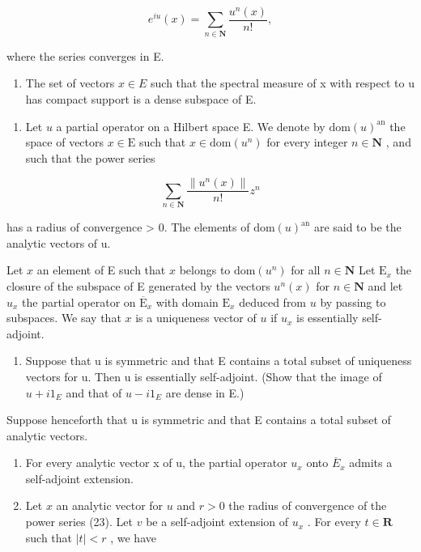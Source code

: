 \[
e ^ {i u} (x) = \sum_ {n \in \mathbf {N}} \frac {u ^ {n} (x)}{n !},
\]

where the series converges in E.

\begin{enumerate}
\def\labelenumi{\alph{enumi})}
\setcounter{enumi}{1}
\tightlist
\item
  The set of vectors \(x \in E\) such that the spectral measure of x with respect to u has compact support is a dense subspace of E.
\end{enumerate}

\begin{enumerate}
\def\labelenumi{\arabic{enumi})}
\setcounter{enumi}{19}
\tightlist
\item
  Let \(u\) a partial operator on a Hilbert space E. We denote by \(\mathrm{dom}(u)^{\mathrm{an}}\) the space of vectors \(x \in \mathrm{E}\) such that \(x \in \mathrm{dom}(u^n)\) for every integer \(n \in \mathbf{N}\) , and such that the power series
\end{enumerate}

\[
\sum_ {n \in \mathbf {N}} \frac {\| u ^ {n} (x) \|}{n !} z ^ {n}\tag{23}
\]

has a radius of convergence \textgreater{} 0. The elements of \(\text{dom}(u)^{\text{an}}\) are said to be the analytic vectors of u.

Let \(x\) an element of E such that \(x\) belongs to \(\mathrm{dom}(u^n)\) for all \(n \in \mathbf{N}\) Let \(\mathrm{E}_x\) the closure of the subspace of E generated by the vectors \(u^n(x)\) for \(n \in \mathbf{N}\) and let \(u_x\) the partial operator on \(\overline{\mathrm{E}}_x\) with domain \(\mathrm{E}_x\) deduced from \(u\) by passing to subspaces. We say that \(x\) is a uniqueness vector of \(u\) if \(u_x\) is essentially self-adjoint.

\begin{enumerate}
\def\labelenumi{\alph{enumi})}
\tightlist
\item
  Suppose that u is symmetric and that E contains a total subset of uniqueness vectors for u. Then u is essentially self-adjoint. (Show that the image of \(u + i1_{E}\) and that of \(u - i1_{E}\) are dense in E.)
\end{enumerate}

Suppose henceforth that u is symmetric and that E contains a total subset of analytic vectors.

\begin{enumerate}
\def\labelenumi{\alph{enumi})}
\setcounter{enumi}{1}
\item
  For every analytic vector x of u, the partial operator \(u_{x}\) onto \(\overline{E}_{x}\) admits a self-adjoint extension.
\item
  Let \(x\) an analytic vector for \(u\) and \(r > 0\) the radius of convergence of the power series (23). Let \(v\) be a self-adjoint extension of \(u_x\) . For every \(t \in \mathbf{R}\) such that \(|t| < r\) , we have
\end{enumerate}

